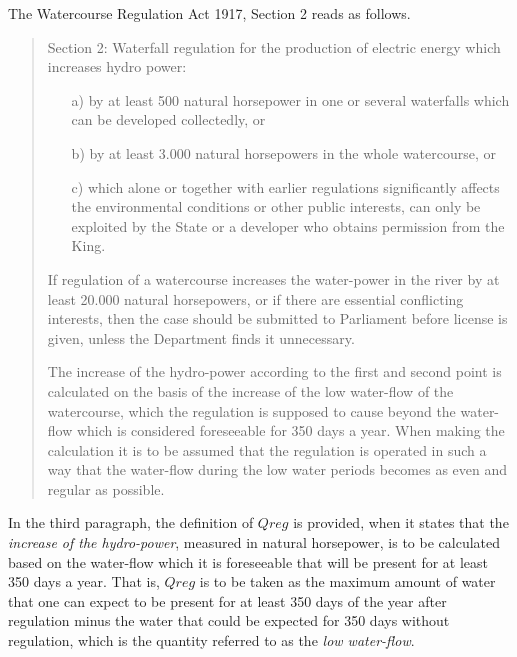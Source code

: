 The Watercourse Regulation Act 1917, Section 2 reads as follows.

\begin{quote}
Section 2:  Waterfall regulation for the production of electric energy which increases hydro power:
\begin{itemize}
\item[a)]            by at least 500 natural horsepower in one or several waterfalls which can be developed 
                 collectedly, or

\item [b)]             by at least 3.000 natural horsepowers in the whole watercourse, or

\item [c)]              which alone or together with earlier regulations significantly affects the environmental
                 conditions or other public interests, can only be exploited by the State or  
               a developer who obtains permission from the King.

\end{itemize}

If regulation of a watercourse increases the water-power in the river by at least 20.000 natural horsepowers, or if there are essential conflicting interests, then the case should be submitted to Parliament before license is given, unless the Department finds it unnecessary.

The increase of the hydro-power according to the first and second point is calculated on the basis of the increase of the low water-flow of the watercourse, which the regulation is supposed to cause beyond the water-flow which is considered foreseeable for 350 days a year. When making the calculation it is to be assumed that the regulation is operated in such a way that the water-flow during the low water periods becomes as even and regular as possible.  
\end{quote}

In the third paragraph, the definition of $Qreg$ is provided, when it states that the \emph{increase of the hydro-power}, measured in natural horsepower, is to be calculated based on the water-flow which it is foreseeable that will be present for at least 350 days a year. That is, $Qreg$ is to be taken as the maximum amount of water that one can expect to be present for at least 350 days of the year after regulation minus the water that could be expected for 350 days without regulation, which is the quantity referred to as the \emph{low water-flow}.

